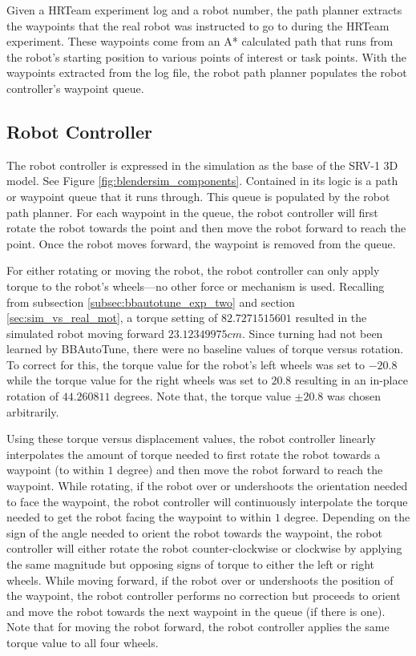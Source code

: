 Given a HRTeam experiment log and a robot number, the path planner extracts the waypoints that the real robot was instructed to go to during the HRTeam experiment. These waypoints come from an A* calculated path that runs from the robot's starting position to various points of interest or task points. With the waypoints extracted from the log file, the robot path planner populates the robot controller's waypoint queue. 


\subsection{Robot Controller}


The robot controller is expressed in the simulation as the base of the SRV-1 3D model. See Figure \ref{fig:blendersim_components}. Contained in its logic is a path or waypoint queue that it runs through. This queue is populated by the robot path planner. For each waypoint in the queue, the robot controller will first rotate the robot towards the point and then move the robot forward to reach the point. Once the robot moves forward, the waypoint is removed from the queue. 

For either rotating or moving the robot, the robot controller can only apply torque to the robot's wheels---no other force or mechanism is used. Recalling from subsection \ref{subsec:bbautotune_exp_two} and section \ref{sec:sim_vs_real_mot}, a torque setting of $82.7271515601$ resulted in the simulated robot moving forward $23.12349975cm$. Since turning had not been learned by BBAutoTune, there were no baseline values of torque versus rotation. To correct for this, the torque value for the robot's left wheels was set to $-20.8$ while the torque value for the right wheels was set to $20.8$ resulting in an in-place rotation of $44.260811$ degrees. Note that, the torque value $\pm20.8$ was chosen arbitrarily.  

Using these torque versus displacement values, the robot controller linearly interpolates the amount of torque needed to first rotate the robot towards a waypoint (to within $1$ degree) and then move the robot forward to reach the waypoint. While rotating, if the robot over or undershoots the orientation needed to face the waypoint, the robot controller will continuously interpolate the torque needed to get the robot facing the waypoint to within $1$ degree. Depending on the sign of the angle needed to orient the robot towards the waypoint, the robot controller will either rotate the robot counter-clockwise or clockwise by applying the same magnitude but opposing signs of torque to either the left or right wheels. While moving forward, if the robot over or undershoots the position of the waypoint, the robot controller performs no correction but proceeds to orient and move the robot towards the next waypoint in the queue (if there is one). Note that for moving the robot forward, the robot controller applies the same torque value to all four wheels.   

